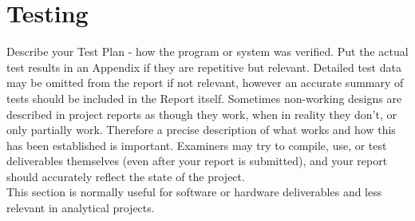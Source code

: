 \section{Testing}
Describe your Test Plan - how the program or system
was verified. Put the actual test results in an Appendix if they are repetitive but relevant. Detailed test data
may be omitted from the report if not relevant,
however an accurate summary of tests should be
included in the Report itself. Sometimes non-working
designs are described in project reports as though
they work, when in reality they don't, or only partially
work. Therefore a precise description of what works
and how this has been established is important.
Examiners may try to compile, use, or test
deliverables themselves (even after your report is
submitted), and your report should accurately reflect
the state of the project.\\ \newline \noindent This section is normally useful for software or
hardware deliverables and less relevant in analytical
projects.
